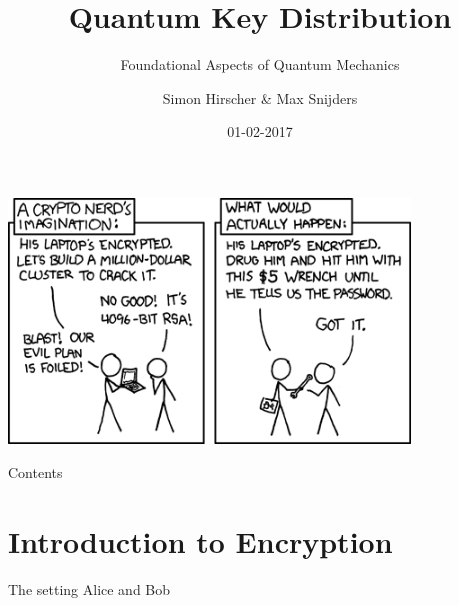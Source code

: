 \documentclass{beamer}
\title{Quantum Key Distribution}
\subtitle{Foundational Aspects of Quantum Mechanics}
\date{01-02-2017}
\author[Hirscher, Snijders]{Simon Hirscher \& Max Snijders}
\begin{document}

	\begin{frame}
	\end{frame}

	\begin{frame}
		\begin{center}
		\includegraphics[width=0.8\textwidth]{images/xkcd-security.png}
		\end{center}
	\end{frame}

	\begin{frame}
		\titlepage
	\end{frame}

	\begin{frame}{Contents} %
		\tableofcontents
	\end{frame}

	\section{Introduction to Encryption}
	\begin{frame}{The setting}
		Alice and Bob
	\end{frame}
\end{document}

